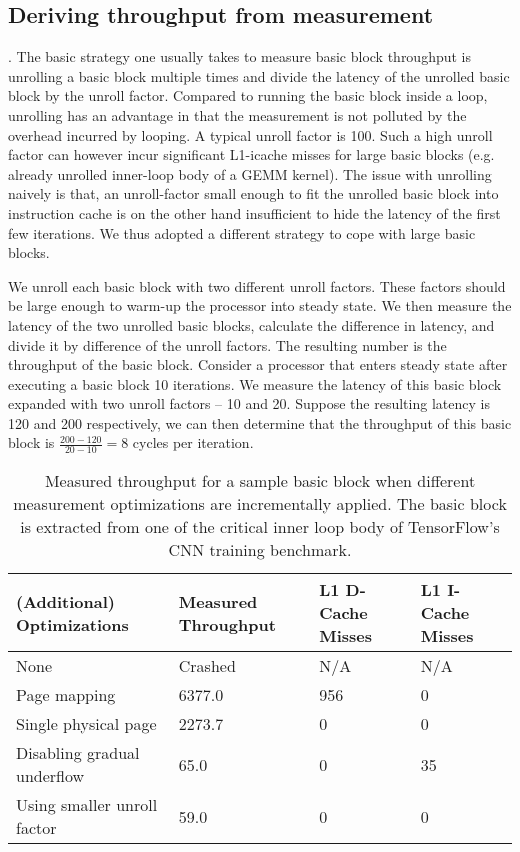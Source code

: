 \subsection{Deriving throughput from measurement}.
The basic strategy one usually takes to measure basic block throughput
is unrolling a basic block multiple times and divide the latency of the
unrolled basic block by the unroll factor.
Compared to running the basic block inside a loop,
unrolling has an advantage in that the measurement is not polluted by
the overhead incurred by looping.
A typical unroll factor is 100\cite{ithemal,uops}.
Such a high unroll factor can however incur significant
L1-icache misses for large basic blocks
(e.g. already unrolled inner-loop body of a GEMM kernel).
The issue with unrolling naively is that,
an unroll-factor small enough to fit the 
unrolled basic block into instruction cache is on the other hand
insufficient to hide the latency of the first few iterations.
We thus adopted a different strategy to cope with large basic blocks.

We unroll each basic block with two different unroll factors.
These factors should be large enough 
to warm-up the processor into steady state.
We then measure the latency of the two unrolled basic blocks,
calculate the difference in latency, and divide it 
by difference of the unroll factors.
The resulting number is the throughput of the basic block.
Consider a processor that enters steady state
after executing a basic block 10 iterations.
We measure the latency of this basic block expanded with
two unroll factors -- 10 and 20.
Suppose the resulting latency is 120 and 200 respectively,
we can then determine that the throughput of this basic block
is $\frac{200-120}{20-10} = 8$ cycles per iteration.


\begin{table}
\begin{tabular}{
|p{}|p{}|p{}|p{}|}
\hline (Additional) Optimizations &
Measured Throughput &
L1 D-Cache Misses &
L1 I-Cache Misses \\

\hline
None & Crashed & N/A & N/A \\

\hline
Page mapping & 6377.0 & 956 & 0 \\

\hline
Single physical page & 2273.7 & 0 & 0 \\

\hline
Disabling gradual underflow & 65.0 & 0 & 35 \\

\hline
Using smaller unroll factor & 59.0 & 0 & 0\\

\hline
\end{tabular}
\\
\caption{Measured throughput for a sample basic block when
different measurement optimizations are incrementally applied.
The basic block is extracted from one of the critical 
inner loop body of TensorFlow\cite{tensorflow}'s CNN training benchmark.}
\label{tab:ablation}
\end{table}